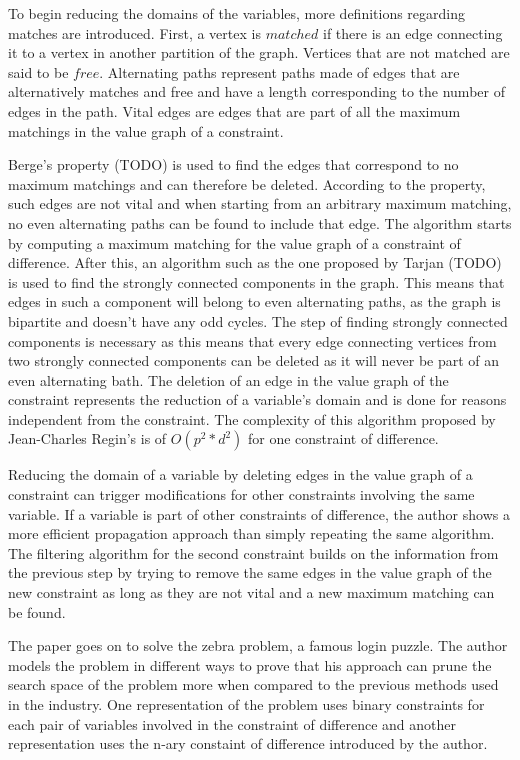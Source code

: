 \documentclass{l4proj}
\begin{document}
\noindent To begin reducing the domains of the variables, more definitions regarding matches are introduced. First, a vertex is $matched$ if there is an edge connecting it to a vertex in another partition of the graph. Vertices that are not matched are said to be $free$. Alternating paths represent paths made of edges that are alternatively matches and free and have a length corresponding to the number of edges in the path. Vital edges are edges that are part of all the maximum matchings in the value graph of a constraint.

\noindent Berge’s property (TODO) is used to find the edges that correspond to no maximum matchings and can therefore be deleted. According to the property, such edges are not vital and when starting from an arbitrary maximum matching, no even alternating paths can be found to include that edge. The algorithm starts by computing a maximum matching for the value graph of a constraint of difference. After this, an algorithm such as the one proposed by Tarjan (TODO) is used to find the strongly connected components in the graph. This means that edges in such a component will belong to even alternating paths, as the graph is bipartite and doesn’t have any odd cycles. The step of finding strongly connected components is necessary as this means that every edge connecting vertices from two strongly connected components can be deleted as it will never be part of an even alternating bath. The deletion of an edge in the value graph of the constraint represents the reduction of a variable’s domain and is done for reasons independent from the constraint. The complexity of this algorithm proposed by Jean-Charles Regin’s is of $O(p^2 * d^2)$ for one constraint of difference.

\noindent Reducing the domain of a variable by deleting edges in the value graph of a constraint can trigger modifications for other constraints involving the same variable. If a variable is part of other constraints of difference, the author shows a more efficient propagation approach than simply repeating the same algorithm. The filtering algorithm for the second constraint builds on the information from the previous step by trying to remove the same edges in the value graph of the new constraint as long as they are not vital and a new maximum matching can be found.

\noindent The paper goes on to solve the zebra problem, a famous login puzzle. The author models the problem in different ways to prove that his approach can prune the search space of the problem more when compared to the previous methods used in the industry. One representation of the problem uses binary constraints for each pair of variables involved in the constraint of difference and another representation uses the n-ary constaint of difference introduced by the author. 
\end{document}
